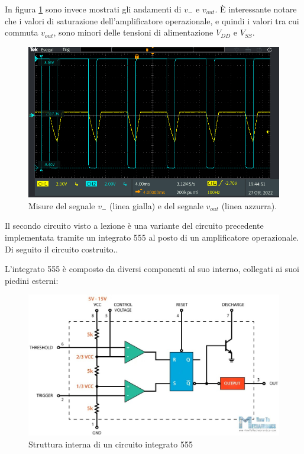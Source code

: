 In figura \ref{fig:segnale_uscita} sono invece mostrati gli andamenti di $v_{-}$ e $v_{out}$. È interessante notare che i valori di saturazione dell'amplificatore operazionale, e quindi i valori tra cui commuta $v_{out}$, sono minori delle tensioni di alimentazione $V_{DD}$ e $V_{SS}$.
\begin{figure}[h!]
	\centering
	\includegraphics[width=\linewidth]{./ImageFiles/Laboratorio 4/TEK00008.PNG}
	\caption{Misure del segnale $v_{-}$ (linea gialla) e del segnale $v_{out}$ (linea azzurra).}
	\label{fig:segnale_uscita}
\end{figure}
\newpage
Il secondo circuito visto a lezione è una variante del circuito precedente implementata tramite un integrato 555 al posto di un amplificatore operazionale. Di seguito il circuito costruito..

L'integrato 555 è composto da diversi componenti al suo interno, collegati ai suoi piedini esterni:
\begin{figure}[ht!]
	\centering
	\includegraphics[width=\linewidth]{./ImageFiles/Laboratorio 4/555internals.jpg}
	\caption{Struttura interna di un circuito integrato 555}
	\label{fig:555_internals}
\end{figure}

